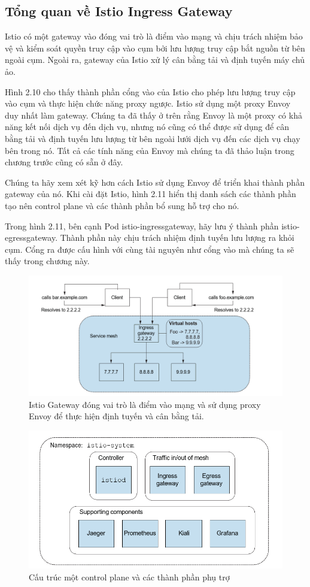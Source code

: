 \documentclass[12pt,a4paper]{report}
\begin{document}
		\subsection{Tổng quan về Istio Ingress Gateway}
		\hspace{0.6cm}Istio có một gateway vào đóng vai trò là điểm vào mạng và chịu trách nhiệm bảo vệ và kiểm soát quyền truy cập vào cụm bởi lưu lượng truy cập bắt nguồn từ bên ngoài cụm. Ngoài ra, gateway của Istio xử lý cân bằng tải và định tuyến máy chủ ảo.
		
		Hình 2.10 cho thấy thành phần cổng vào của Istio cho phép lưu lượng truy cập vào cụm và thực hiện chức năng proxy ngược. Istio sử dụng một proxy Envoy duy nhất làm gateway. Chúng ta đã thấy ở trên rằng Envoy là một proxy có khả năng kết nối dịch vụ đến dịch vụ, nhưng nó cũng có thể được sử dụng để cân bằng tải và định tuyến lưu lượng từ bên ngoài lưới dịch vụ đến các dịch vụ chạy bên trong nó. Tất cả các tính năng của Envoy mà chúng ta đã thảo luận trong chương trước cũng có sẵn ở đây.
		
		Chúng ta hãy xem xét kỹ hơn cách Istio sử dụng Envoy để triển khai thành phần gateway của nó. Khi cài đặt Istio, hình 2.11 hiển thị danh sách các thành phần tạo nên control plane và các thành phần bổ sung hỗ trợ cho nó.
		
		Trong hình 2.11, bên cạnh Pod istio-ingressgateway, hãy lưu ý thành phần istio-egressgateway. Thành phần này chịu trách nhiệm định tuyến lưu lượng ra khỏi cụm. Cổng ra được cấu hình với cùng tài nguyên như cổng vào mà chúng ta sẽ thấy trong chương này.
		
		\begin{figure}[h!]
			\centering
			\includegraphics[width=0.6\linewidth]{Pics/2.2.1-p1}
			\caption{Istio Gateway đóng vai trò là điểm vào mạng và sử dụng proxy Envoy để thực hiện định tuyến và cân bằng tải.}
			\label{fig:2.2.1-1}
		\end{figure}
		
		\begin{figure}[h!]
			\centering
			\includegraphics[width=0.7\linewidth]{Pics/2.2.1-p2}
			\caption{Cấu trúc một control plane và các thành phần phụ trợ}
			\label{fig:2.2.1-2}
		\end{figure}
		
\end{document}
